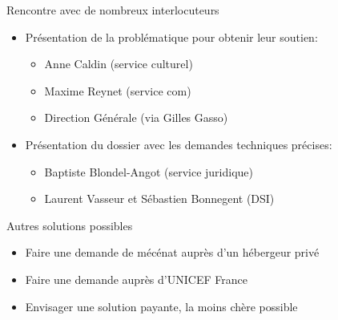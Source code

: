 \begin{frame}
	\begin{block}{Rencontre avec de nombreux interlocuteurs}
	\begin{itemize}
    	\item Présentation de la problématique pour obtenir leur soutien:
		\begin{itemize}
			\item Anne Caldin (service culturel)
			\item Maxime Reynet (service com)
			\item Direction Générale (via Gilles Gasso)
		\end{itemize}
		\item Présentation du dossier avec les demandes techniques précises:
		\begin{itemize}
			\item Baptiste Blondel-Angot (service juridique)
			\item Laurent Vasseur et Sébastien Bonnegent (DSI)
		\end{itemize}    
	\end{itemize}
	\end{block}
\end{frame}

\begin{frame}
	\begin{block}{Autres solutions possibles}
      \begin{itemize}
        \item Faire une demande de mécénat auprès d'un hébergeur privé
        \item Faire une demande auprès d'UNICEF France
        \item Envisager une solution payante, la moins chère possible
      \end{itemize}
    \end{block}
\end{frame}


